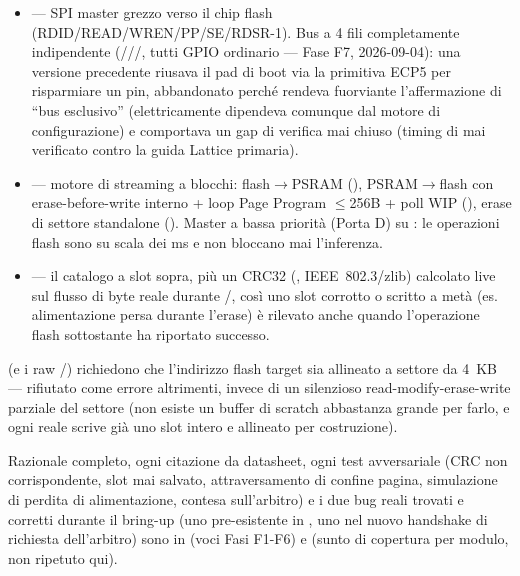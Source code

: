 \begin{fnnote}
\begin{itemize}
\item {} --- SPI master grezzo verso il chip flash
      (RDID/READ/WREN/PP/SE/RDSR-1). Bus a 4 fili completamente indipendente
      (///, tutti GPIO ordinario ---
      Fase F7, 2026-09-04): una versione precedente riusava il pad  di boot
      via la primitiva ECP5  per risparmiare un pin, abbandonato perché
      rendeva fuorviante l'affermazione di ``bus esclusivo'' (elettricamente dipendeva
      comunque dal motore di configurazione) e comportava un gap di verifica mai chiuso
      (timing di  mai verificato contro la guida Lattice primaria).
\item {} --- motore di streaming a blocchi: flash$\to$PSRAM
      (), PSRAM$\to$flash con erase-before-write interno + loop Page
      Program $\leq$256B + poll WIP (), erase di settore standalone
      (). Master a bassa priorità (Porta D) su :
      le operazioni flash sono su scala dei ms e non bloccano mai l'inferenza.
\item {} --- il catalogo a slot sopra, più un CRC32
      (, IEEE~802.3/zlib) calcolato live sul flusso di byte reale durante
      /, così uno slot corrotto o scritto a metà (es.
      alimentazione persa durante l'erase) è rilevato anche quando l'operazione flash
      sottostante ha riportato successo.
\end{itemize}
\end{fnnote}

\begin{fnwarn}
 (e i raw /) richiedono che
l'indirizzo flash target sia allineato a settore da 4~KB --- rifiutato come errore
altrimenti, invece di un silenzioso read-modify-erase-write parziale del settore (non
esiste un buffer di scratch abbastanza grande per farlo, e ogni  reale scrive
già uno slot intero e allineato per costruzione).
\end{fnwarn}

Razionale completo, ogni citazione da datasheet, ogni test avversariale (CRC non
corrispondente, slot mai salvato, attraversamento di confine pagina, simulazione di perdita
di alimentazione, contesa sull'arbitro) e i due bug reali trovati e corretti durante il
bring-up (uno pre-esistente in , uno nel nuovo handshake di
richiesta dell'arbitro) sono in  (voci Fasi F1-F6) e
 (sunto di copertura per modulo, non
ripetuto qui).

